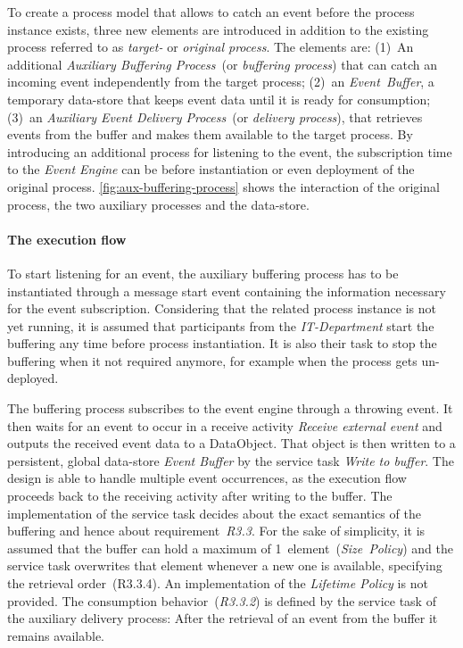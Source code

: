 To create a process model that allows to catch an event before the process instance exists, three new elements are introduced in addition to the existing process referred to as \textit{target-} or \textit{original process}. The elements are: (1)~An additional \textit{Auxiliary Buffering Process}~(or \textit{buffering process}) that can catch an incoming event independently from the target process; (2)~an \textit{Event~Buffer}, a temporary data-store that keeps event data until it is ready for consumption; (3)~an \textit{Auxiliary Event Delivery Process}~(or \textit{delivery process}), that retrieves events from the buffer and makes them available to the target process.
By introducing an additional process for listening to the event, the subscription time to the \textit{Event Engine} can be before instantiation or even deployment of the original process.
\autoref{fig:aux-buffering-process} shows the interaction of the original process, the two auxiliary processes and the data-store.

\paragraph{The execution flow}
To start listening for an event, the auxiliary buffering process has to be instantiated through a message start event containing the information necessary for the event subscription. Considering that the related process instance is not yet running, it is assumed that participants from the \textit{IT-Department} start the buffering any time before process instantiation.
It is also their task to stop the buffering when it not required anymore, for example when the process gets un-deployed.

The buffering process subscribes to the event engine through a throwing event. It then waits for an event to occur in a receive activity \textit{Receive external event} and outputs the received event data to a DataObject. That object is then written to a persistent, global data-store \textit{Event Buffer} by the service task \textit{Write to buffer}. 
The design is able to handle multiple event occurrences, as the execution flow proceeds back to the receiving activity after writing to the buffer.
The implementation of the service task decides about the exact semantics of the buffering and hence about requirement~\textit{R3.3}. For the sake of simplicity, it is assumed that the buffer can hold a maximum of 1~element~(\textit{Size~Policy}) and the service task overwrites that element whenever a new one is available, specifying the retrieval order~(R3.3.4).
An implementation of the \textit{Lifetime Policy} is not provided. 
The consumption behavior~(\textit{R3.3.2}) is defined by the service task of the auxiliary delivery process: After the retrieval of an event from the buffer it remains available.

